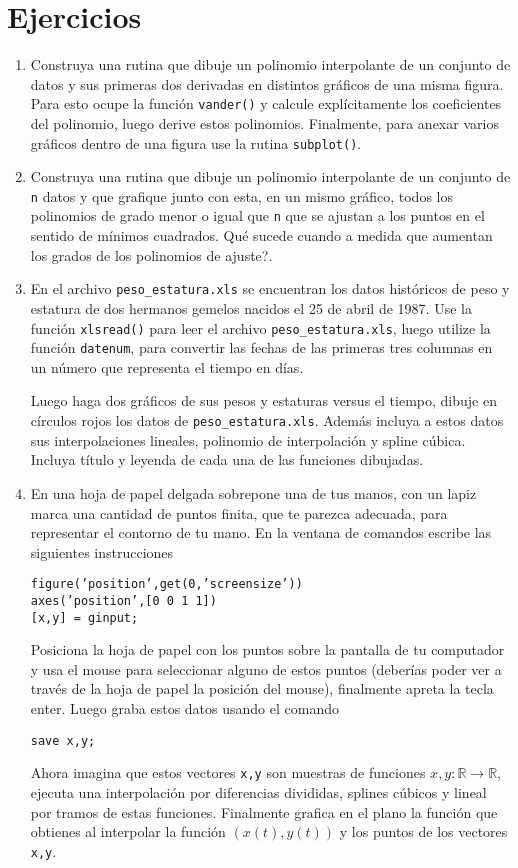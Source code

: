 \documentclass[12pt,letterpaper]{article}
\begin{document}
\section{Ejercicios}
\begin{enumerate}


\item Construya una rutina que dibuje un polinomio interpolante de un conjunto de datos y sus primeras dos derivadas en distintos gr\'aficos de una misma figura. Para esto ocupe la funci\'on \texttt{vander()} y calcule expl\'icitamente los coeficientes del polinomio, luego derive estos polinomios. Finalmente, para anexar varios gr\'aficos dentro de una figura use la rutina \texttt{subplot()}.

\item Construya una rutina que dibuje un polinomio interpolante de un conjunto de \texttt{n} datos y que grafique junto con esta, en un mismo gr\'afico, todos los polinomios de grado menor o igual que \texttt{n} que se ajustan a los puntos en el sentido de m\'inimos cuadrados. \textquestiondown Qu\'e sucede cuando a medida que aumentan los grados de los polinomios de ajuste?.


\item En el archivo \texttt{peso\_estatura.xls} se encuentran los datos hist\'oricos de peso y estatura de dos hermanos gemelos nacidos el 25 de abril de 1987. Use la funci\'on \texttt{xlsread()} para leer el archivo \texttt{peso\_estatura.xls}, luego utilize la funci\'on \texttt{datenum}, para convertir las fechas de las primeras tres columnas en un n\'umero que representa el tiempo en d\'ias.

Luego haga dos gr\'aficos de sus pesos y estaturas versus el tiempo, dibuje en c\'irculos rojos los datos de \texttt{peso\_estatura.xls}. Adem\'as incluya a estos datos sus interpolaciones lineales, polinomio de interpolaci\'on y spline c\'ubica. Incluya t\'itulo y leyenda de cada una de las funciones dibujadas.

\item En una hoja de papel delgada sobrepone una de tus manos, con un lapiz marca una cantidad de puntos finita,  que te parezca adecuada, para representar el contorno de tu mano. En la ventana de comandos escribe las siguientes instrucciones
\begin{verbatim}
figure(’position’,get(0,’screensize’))
axes(’position’,[0 0 1 1])
[x,y] = ginput;
\end{verbatim}
Posiciona la hoja de papel con los puntos sobre la pantalla de tu computador y usa el mouse para seleccionar alguno de estos puntos (deberías poder ver a trav\'es de la hoja de papel la posici\'on del mouse), finalmente apreta la tecla enter. Luego graba estos datos usando el comando 
\begin{verbatim}
save x,y;
\end{verbatim}
Ahora imagina que estos vectores \texttt{x,y} son muestras de funciones $x,y:\mathbb{R}\rightarrow \mathbb{R}$, ejecuta una interpolaci\'on por diferencias divididas, splines c\'ubicos y lineal por tramos de estas funciones. Finalmente grafica en el plano la funci\'on que obtienes al interpolar la funci\'on $(x(t),y(t))$ y los puntos de los vectores \texttt{x,y}.


\end{enumerate}
\end{document}
